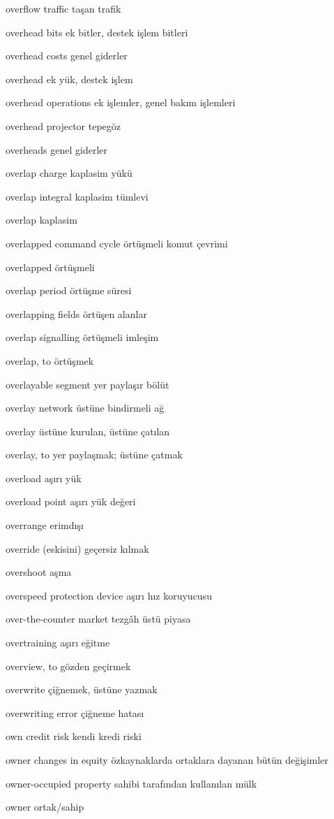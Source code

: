 \documentclass[12pt,fleqn]{article}\usepackage{../../common}
\begin{document}
overflow traffic taşan trafik

overhead bits ek bitler, destek işlem bitleri

overhead costs genel giderler

overhead ek yük, destek işlem

overhead operations ek işlemler, genel bakım işlemleri

overhead projector tepegöz

overheads genel giderler

overlap charge kaplasim yükü

overlap integral kaplasim tümlevi

overlap kaplasim

overlapped command cycle örtüşmeli komut çevrimi

overlapped örtüşmeli

overlap period örtüşme süresi

overlapping fields örtüşen alanlar

overlap signalling örtüşmeli imleşim

overlap, to örtüşmek

overlayable segment yer paylaşır bölüt

overlay network üstüne bindirmeli ağ

overlay üstüne kurulan, üstüne çatılan

overlay, to yer paylaşmak; üstüne çatmak

overload aşırı yük

overload point aşırı yük değeri

overrange erimdışı

override (eskisini) geçersiz kılmak

overshoot aşma

overspeed protection device aşırı hız koruyucusu

over-the-counter market tezgâh üstü piyasa

overtraining aşırı eğitme

overview, to gözden geçirmek

overwrite çiğnemek, üstüne yazmak

overwriting error çiğneme hatası

own credit risk kendi kredi riski

owner changes in equity özkaynaklarda ortaklara dayanan bütün değişimler

owner-occupied property sahibi tarafından kullanılan mülk

owner ortak/sahip
\end{document}
